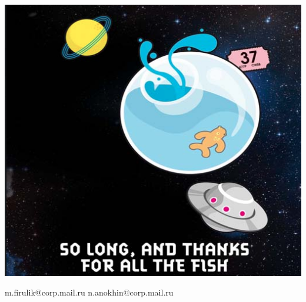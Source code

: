 \documentclass[10pt,a4paper]{beamer}
\begin{document}

\begin{frame}{}

\begin{center}
\includegraphics[scale=0.43]{images/fish.png}

m.firulik$@$corp.mail.ru \quad n.anokhin$@$corp.mail.ru

\end{center}

\end{frame}

\end{document}
